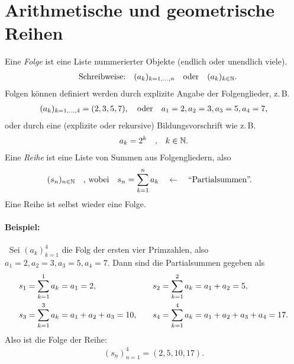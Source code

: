 \thispagestyle{plain}
\section{Arithmetische und geometrische Reihen}

Eine \emph{Folge} ist eine Liste nummerierter Objekte (endlich oder unendlich viele).
\begin{align}
    \qq{Schreibweise:} (a_k)_{k=1,\hdots,n} \qq{oder} (a_k)_{k\in\mathbb{N}}.
\end{align}
Folgen können definiert werden durch explizite Angabe der Folgenglieder, z.\,B. 
\begin{align}
    (a_k)_{k=1,\hdots,4} = (2,3,5,7), \qq{oder} a_1 = 2, a_2=3, a_3=5, a_4 = 7,
\end{align}
oder durch eine (explizite oder rekursive) Bildungsvorschrift wie z.\,B. 
\begin{align}
    a_k = 2^k \qq{,} k\in\mathbb{N}.
\end{align}
Eine \emph{Reihe} ist eine Liste von Summen aus Folgengliedern, also 
\begin{align}
    (s_n)_{n\in\mathbb{N}} \qq{, wobei} s_n = \sum_{k=1}^n a_k  \quad \leftarrow \qq{``Partialsummen''.}
\end{align}
Eine Reihe ist selbst wieder eine Folge. 

\paragraph{Beispiel:}$~$ Sei $(a_k)_{k=1}^4$ die Folg der ersten vier Primzahlen, also $a_1 = 2, a_2 = 3, a_3 = 5, a_4 = 7$. Dann sind die Partialsummen gegeben als 
\begin{alignat}{3}
    s_1 &= \sum_{k=1}^1 a_k = a_1 = 2, \quad & s_2&= \sum_{k=1}^2 a_k = a_1+a_2 = 5, \notag \\
    s_3 &= \sum_{k=1}^3 a_k = a_1 + a_2 + a_3 = 10, \quad & s_4&= \sum_{k=1}^4 a_k = a_1 + a_2 + a_3 + a_4 = 17.
\end{alignat}
Also ist die Folge der Reihe: 
\begin{align}
    (s_n)_{n=1}^4 = (2,5,10,17).
\end{align}

